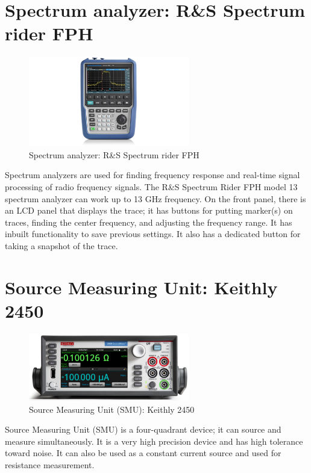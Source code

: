 \documentclass[12pt,a4paper,bold]{thesis}
\theoremstyle{thm}
\theoremstyle{definition}
\begin{document}
\section{Spectrum analyzer: R\&S Spectrum rider FPH}
\begin{figure}[H]
	\centering
   \includegraphics[width=7cm]{Images/72.jpg} 
   \caption{Spectrum analyzer: R\&S Spectrum rider FPH}
\end{figure}
\indent\indent\indent Spectrum analyzers are used for finding frequency response and real-time signal processing of radio frequency signals. The R\&S Spectrum Rider FPH model 13 spectrum analyzer can work up to 13 GHz frequency. On the front panel, there is an LCD panel that displays the trace; it has buttons for putting marker(s) on traces, finding the center frequency, and adjusting the frequency range. It has inbuilt functionality to save previous settings. It also has a dedicated button for taking a snapshot of the trace.
\section{Source Measuring Unit: Keithly 2450}
\begin{figure}[H]
	\centering
   \includegraphics[width=7cm]{Images/74.png} 
   \caption{Source Measuring Unit (SMU): Keithly 2450}
\end{figure}
\indent\indent\indent Source Measuring Unit (SMU) is a four-quadrant device; it can source and measure simultaneously. It is a very high precision device and has high tolerance toward noise. It can also be used as a constant current source and used for resistance measurement.
\end{document}
